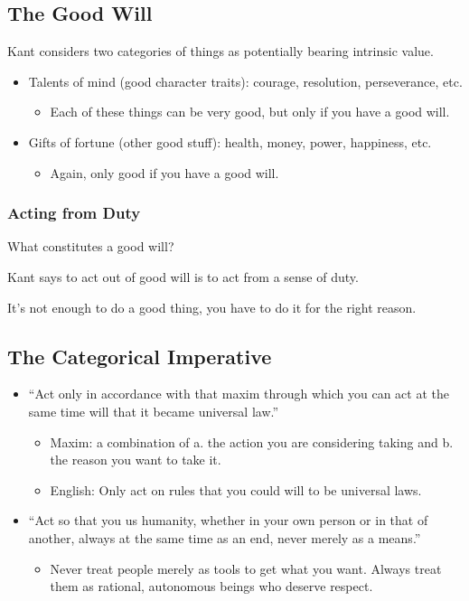 \documentclass[12pt]{article}
\begin{document}
\subsection{The Good Will}

Kant considers two categories of things as potentially bearing intrinsic value.

\begin{itemize}
    \item Talents of mind (good character traits): courage, resolution, perseverance, etc.
          \begin{itemize}
              \item Each of these things can be very good, but only if you have a good will.
          \end{itemize}
    \item Gifts of fortune (other good stuff): health, money, power, happiness, etc.
          \begin{itemize}
              \item Again, only good if you have a good will.
          \end{itemize}
\end{itemize}

\subsubsection{Acting from Duty}

What constitutes a good will?

Kant says to act out of good will is to act from a sense of duty.

It's not enough to do a good thing, you have to do it for the right reason.

\subsection{The Categorical Imperative}

\begin{itemize}
    \item ``Act only in accordance with that maxim through which you can act at the same time will that it became universal law.''
          \begin{itemize}
              \item Maxim: a combination of a. the action you are considering taking and b. the reason you want to take it.
              \item English: Only act on rules that you could will to be universal laws.
          \end{itemize}
    \item ``Act so that you us humanity, whether in your own person or in that of another, always at the same time as an end, never merely as a means.''
          \begin{itemize}
              \item Never treat people merely as tools to get what you want. Always treat them as rational, autonomous beings who deserve respect.
          \end{itemize}
\end{itemize}
\end{document}
